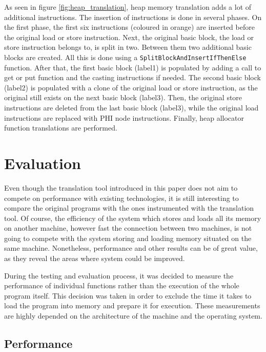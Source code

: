 \documentclass[bsc,frontabs,twoside,singlespacing,parskip,deptreport]{infthesis}     %
\begin{document}
As seen in figure \ref{fig:heap_translation}, heap memory translation adds a lot of additional instructions. The insertion of instructions is done in several phases. On the first phase, the first six instructions (coloured in orange) are inserted before the original load or store instruction. Next, the original basic block, the load or store instruction belongs to, is split in two. Between them two additional basic blocks are created. All this is done using a \texttt{SplitBlockAndInsertIfThenElse} function. After that, the first basic block (label1) is populated by adding a call to get or put function and the casting instructions if needed. The second basic block (label2) is populated with a clone of the original load or store instruction, as the original still exists on the next basic block (label3). Then, the original store instructions are deleted from the last basic block (label3), while the original load instructions are replaced with PHI node instructions. Finally, heap allocator function translations are performed.

\chapter{Evaluation}

Even though the translation tool introduced in this paper does not aim to compete on performance with existing technologies, it is still interesting to compare the original  programs with the ones instrumented with the translation tool. Of course, the efficiency of the system which stores and loads all its memory on another machine, however fast the connection between two machines, is not going to compete with the system storing and loading memory situated on the same machine. Nonetheless, performance and other results can be of great value, as they reveal the areas where system could be improved.


During the testing and evaluation process, it was decided to measure the performance of individual functions rather than the execution of the whole program itself. This decision was taken in order to exclude the time it takes to load the program into memory and prepare it for execution. These measurements are highly depended on the architecture of the machine and the operating system.

\section{Performance}
\end{document}
